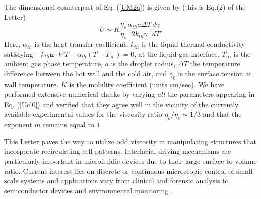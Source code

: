 \documentclass[%
 amsmath,amssymb,
 aps,
10.5pt]{revtex4-2}
\def\rr#1{(\ref{#1})}
\newcommand{\be}{\begin{equation}}
\newcommand{\ee}{\end{equation}}
\begin{document}
The dimensional counterpart of Eq. \rr{UM2a} is given by (this is Eq.(2) of the Letter)
\be \label{Ucl0}
U \sim K \frac{\eta_o}{\eta_e}\frac{ \alpha_{th}a\Delta T}{2 k_{th}\gamma}\frac{d \gamma}{dT}.
\ee
Here, $\alpha_{th}$ is the 
heat transfer coefficient, $k_{th}$ is the liquid thermal conductivity satisfying $-k_{th}\mathbf{n} \cdot\nabla T + \alpha_{th}(T-T_\infty)=0$, at the liquid-gas interface, $T_\infty$ is the ambient gas phase temperature, $a$ is the droplet radius, $\Delta T$ the temperature difference between the hot wall
and the cold air, 
and $\gamma_0$ is the surface tension at wall 
temperature. $K$ is the mobility coefficient (units cm/sec). 
We have performed extensive numerical checks by varying \emph{all} the parameters appearing in 
Eq. \rr{Ucl0} and verified that they agree well in the vicinity of the currently available experimental 
values for the viscosity ratio $\eta_o/\eta_e\sim 1/3$ and that the exponent $m$ remains equal
to $1$. 


This Letter paves the way to utilize odd viscosity in manipulating structures that incorporate
recirculating cell patterns. Interfacial driving mechanisms are particularly important in microfluidic devices
due to their large surface-to-volume ratio. Current interest lies on discrete or 
continuous microscopic control of small-scale systems and applications vary 
from clinical and forensic analysis to semiconductor devices and environmental 
monitoring \cite{Darhuber2005}. 
\end{document}
